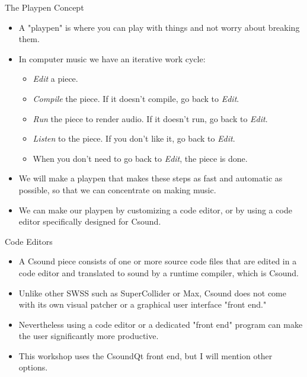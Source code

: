 \documentclass{beamer}
\begin{document}
    \begin{frame}{The Playpen Concept}
        \begin{itemize}
            \item A "playpen" is where you can play with things and not worry 
            about breaking them.
            \item In computer music we have an iterative work cycle:
            	\begin{itemize}
		   \item \textit{Edit} a piece.
		   \item \textit{Compile} the piece. If it doesn't compile, go back to \textit{Edit}.
		   \item \textit{Run} the piece to render audio. If it doesn't run, go back to \emph{Edit}.
		   \item \textit{Listen} to the piece. If you don't like it, go back to \emph{Edit}.
		   \item When you don't need to go back to \emph{Edit}, the piece is done.
	        \end{itemize}
            \item  We will make a playpen that makes these steps as fast and 
            automatic as possible, so that we can concentrate on making music.
            \item We can make our playpen by customizing a code editor, or by 
            using a code editor specifically designed for Csound.
          \end{itemize}    
    \end{frame}
    
    \begin{frame}{Code Editors}
        \begin{itemize}
            \item A Csound piece consists of one or more source code files that are
            edited in a code editor and translated to sound by a runtime compiler, which is
            Csound.
            \item Unlike other SWSS such as SuperCollider or Max, Csound does not
            come with its own visual patcher or a graphical user interface "front end."
            \item Nevertheless using a code editor or a dedicated "front end"
            program can make the user significantly more productive.
            \item This workshop uses the CsoundQt front end, but I will mention
            other options.
        \end{itemize}
    \end{frame}
    
\end{document}
